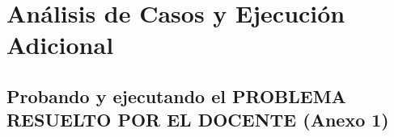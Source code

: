 \documentclass{article}
\makeatletter
\newcommand{\itemEmail}{rchambillap@unsa.edu.pe}
\newcommand{\itemStudent}{Chambilla Perca, Gutierrez Ccama, Valdivia Segovia}
\newcommand{\itemCourse}{Sistemas Distribuidos}
\newcommand{\itemSemester}{VI}
\newcommand{\itemSchool}{Escuela Profesional de Ingeniería de Sistemas}
\newcommand{\itemAcademic}{2026 - A}
\newcommand{\itemInput}{Del 13 de Abril 2026}
\newcommand{\itemOutput}{Al 17 de Abril 2026}
\newcommand{\itemPracticeNumber}{01}
\newcommand{\itemTheme}{Los Hilos (Threads)}
\makeatother
\begin{document}
	\vspace*{10px}

	
	

    \section{Análisis de Casos y Ejecución Adicional}
    
    \subsection{Probando y ejecutando el PROBLEMA RESUELTO POR EL DOCENTE (Anexo 1)}
    
\end{document}
